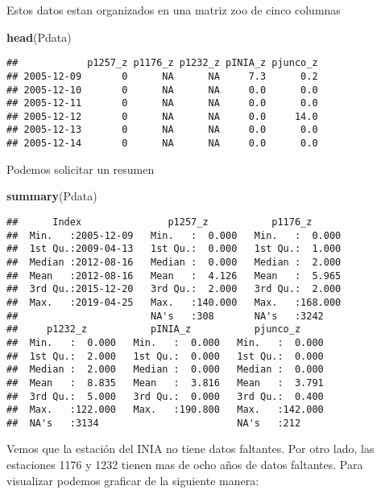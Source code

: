 \documentclass[]{article}
\newenvironment{Shaded}{\begin{snugshade}}{\end{snugshade}}
\newcommand{\KeywordTok}[1]{\textcolor[rgb]{0.13,0.29,0.53}{\textbf{#1}}}
\newcommand{\NormalTok}[1]{#1}
\begin{document}
Estos datos estan organizados en una matriz zoo de cinco columnas

\begin{Shaded}
\begin{Highlighting}[]
\KeywordTok{head}\NormalTok{(Pdata)}
\end{Highlighting}
\end{Shaded}

\begin{verbatim}
##            p1257_z p1176_z p1232_z pINIA_z pjunco_z
## 2005-12-09       0      NA      NA     7.3      0.2
## 2005-12-10       0      NA      NA     0.0      0.0
## 2005-12-11       0      NA      NA     0.0      0.0
## 2005-12-12       0      NA      NA     0.0     14.0
## 2005-12-13       0      NA      NA     0.0      0.0
## 2005-12-14       0      NA      NA     0.0      0.0
\end{verbatim}

Podemos solicitar un resumen

\begin{Shaded}
\begin{Highlighting}[]
\KeywordTok{summary}\NormalTok{(Pdata)}
\end{Highlighting}
\end{Shaded}

\begin{verbatim}
##      Index               p1257_z           p1176_z       
##  Min.   :2005-12-09   Min.   :  0.000   Min.   :  0.000  
##  1st Qu.:2009-04-13   1st Qu.:  0.000   1st Qu.:  1.000  
##  Median :2012-08-16   Median :  0.000   Median :  2.000  
##  Mean   :2012-08-16   Mean   :  4.126   Mean   :  5.965  
##  3rd Qu.:2015-12-20   3rd Qu.:  2.000   3rd Qu.:  2.000  
##  Max.   :2019-04-25   Max.   :140.000   Max.   :168.000  
##                       NA's   :308       NA's   :3242     
##     p1232_z           pINIA_z           pjunco_z      
##  Min.   :  0.000   Min.   :  0.000   Min.   :  0.000  
##  1st Qu.:  2.000   1st Qu.:  0.000   1st Qu.:  0.000  
##  Median :  2.000   Median :  0.000   Median :  0.000  
##  Mean   :  8.835   Mean   :  3.816   Mean   :  3.791  
##  3rd Qu.:  5.000   3rd Qu.:  0.000   3rd Qu.:  0.400  
##  Max.   :122.000   Max.   :190.800   Max.   :142.000  
##  NA's   :3134                        NA's   :212
\end{verbatim}

Vemos que la estación del INIA no tiene datos faltantes. Por otro lado,
las estaciones 1176 y 1232 tienen mas de ocho años de datos faltantes.
Para visualizar podemos graficar de la siguiente manera:
\end{document}
